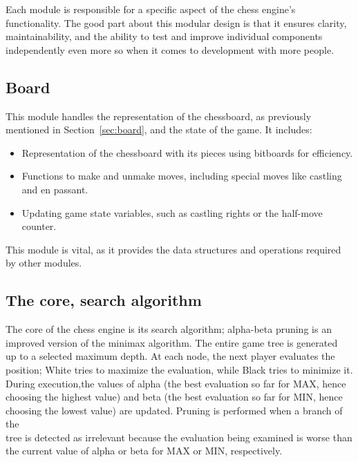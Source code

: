 Each module is responsible for a specific aspect of the chess engine's functionality. The good part about this modular design is that it ensures clarity, maintainability, and the ability to test and improve individual components independently even more so when it comes to development with more people.

\subsection{Board}

\noindent This module handles the representation of the chessboard, as previously mentioned in Section~\ref{sec:board}, and the state of the game. It includes:
\begin{itemize}
    \item Representation of the chessboard with its pieces using bitboards for efficiency.
    \item Functions to make and unmake moves, including special moves like castling and en passant.
    \item Updating game state variables, such as castling rights or the half-move counter.
\end{itemize}

\noindent This module is vital, as it provides the data structures and operations required by other modules.

\subsection{The core, search algorithm}

The core of the chess engine is its search algorithm; alpha-beta pruning is an\\
improved version of the minimax algorithm. The entire game tree is generated\\
up to a selected maximum depth. At each node, the next player evaluates the\\
position; White tries to maximize the evaluation, while Black tries to minimize it.\\
During execution,the values of alpha (the best evaluation so far for MAX, hence\\
choosing the highest value) and beta (the best evaluation so far for MIN, hence\\
choosing the lowest value) are updated. Pruning is performed when a branch of the\\
tree is detected as irrelevant because the evaluation being examined is worse than\\
the current value of alpha or beta for MAX or MIN, respectively.\\

